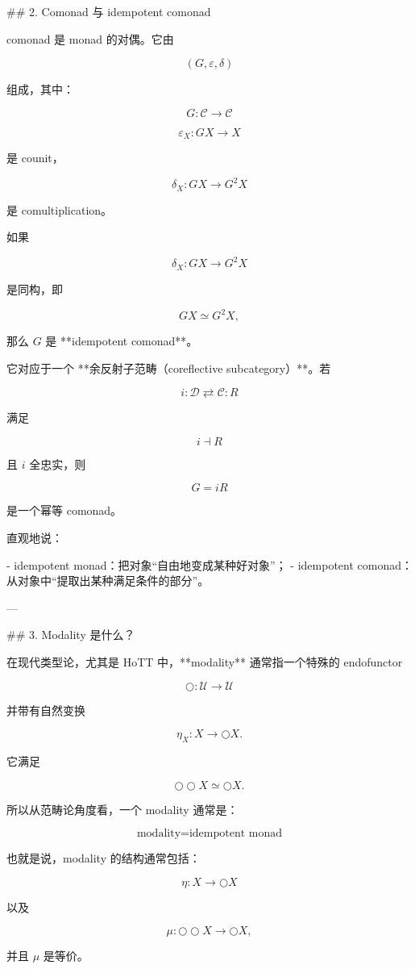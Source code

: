\documentclass{ctexart}
\begin{document}
\begin{markdown}
## 2. Comonad 与 idempotent comonad

comonad 是 monad 的对偶。它由

$$
(G,\varepsilon,\delta)
$$

组成，其中：

$$
G:\mathcal C\to\mathcal C
$$

$$
\varepsilon_X:GX\to X
$$

是 counit，

$$
\delta_X:GX\to G^2X
$$

是 comultiplication。

如果

$$
\delta_X:GX\to G^2X
$$

是同构，即

$$
GX\simeq G^2X,
$$

那么 $G$ 是 **idempotent comonad**。

它对应于一个 **余反射子范畴（coreflective subcategory）**。若

$$
i:\mathcal D\rightleftarrows\mathcal C:R
$$

满足

$$
i\dashv R
$$

且 $i$ 全忠实，则

$$
G=iR
$$

是一个幂等 comonad。

直观地说：

- idempotent monad：把对象“自由地变成某种好对象”；
- idempotent comonad：从对象中“提取出某种满足条件的部分”。

---

## 3. Modality 是什么？

在现代类型论，尤其是 HoTT 中，**modality** 通常指一个特殊的 endofunctor

$$
\bigcirc:\mathcal U\to\mathcal U
$$

并带有自然变换

$$
\eta_X:X\to \bigcirc X.
$$

它满足

$$
\bigcirc\bigcirc X\simeq \bigcirc X.
$$

所以从范畴论角度看，一个 modality 通常是：

$$
\boxed{\text{modality}=\text{idempotent monad}}
$$

也就是说，modality 的结构通常包括：

$$
\eta:X\to \bigcirc X
$$

以及

$$
\mu:\bigcirc\bigcirc X\to \bigcirc X,
$$

并且 $\mu$ 是等价。


\end{markdown}
\end{document}
